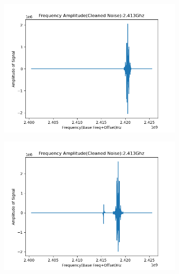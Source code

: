 \begin{itemize}
\begin{figure}[H]
      \begin{subfigure}{0.5\textwidth}
        \includegraphics[width=0.9\linewidth]{ images/drone_2.413Ghz-FA-10.00.png }
        \label{fig:subim3.1}
      \end{subfigure}
      \begin{subfigure}{0.5\textwidth}
        \includegraphics[width=0.9\linewidth]{ images/drone_2.413Ghz-FA-16.00.png }
        \label{fig:subim4.1}
      \end{subfigure}


\end{figure}
\end{itemize}
